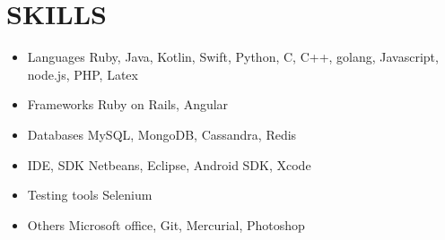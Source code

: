 \documentclass[11pt,a4paper]{article}
\begin{document}
\section*{SKILLS}
\TabPositions{3cm}
\begin{itemize}[noitemsep]
\item Languages \tab Ruby, Java, Kotlin, Swift, Python, C, C++, golang, Javascript, node.js, PHP, Latex
\item Frameworks \tab Ruby on Rails, Angular
\item Databases \tab MySQL, MongoDB, Cassandra, Redis
\item IDE, SDK \tab Netbeans, Eclipse, Android SDK, Xcode
\item Testing tools \tab Selenium
\item Others \tab Microsoft office, Git, Mercurial, Photoshop
\end{itemize}
\newpage
\end{document}
